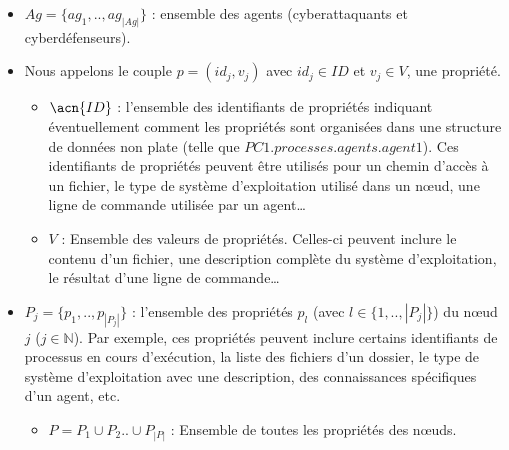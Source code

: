 \begin{itemize}

    \item $Ag = \{ag_1,..,ag_{|Ag|}\}$ : ensemble des agents (cyberattaquants et cyberdéfenseurs).

    \item Nous appelons le couple $p = (id_{j}, v_{j})$ avec $id_j \in {ID}$ et $v_j \in V$, une propriété.
          \begin{itemize}
              \item $\acn{ID}$ : l'ensemble des identifiants de propriétés indiquant éventuellement comment les propriétés sont organisées dans une structure de données non plate (telle que $PC1.processes.agents.agent1$). Ces identifiants de propriétés peuvent être utilisés pour un chemin d'accès à un fichier, le type de système d'exploitation utilisé dans un nœud, une ligne de commande utilisée par un agent\dots
              \item $V$ : Ensemble des valeurs de propriétés. Celles-ci peuvent inclure le contenu d'un fichier, une description complète du système d'exploitation, le résultat d'une ligne de commande\dots
          \end{itemize}

    \item $P_{j} = \{ p_1, .., p_{|P_{j}|} \}$ : l'ensemble des propriétés $p_{l}$ (avec $l \in \{1,..,|P_{j}|\}$) du nœud $j$ ($j \in \mathbb{N} $). Par exemple, ces propriétés peuvent inclure certains identifiants de processus en cours d'exécution, la liste des fichiers d'un dossier, le type de système d'exploitation avec une description, des connaissances spécifiques d'un agent, etc.
          \begin{itemize}
              \item $P = P_1 \cup P_2 .. \cup P_{|P|} $ : Ensemble de toutes les propriétés des nœuds.
          \end{itemize}


\end{itemize}
